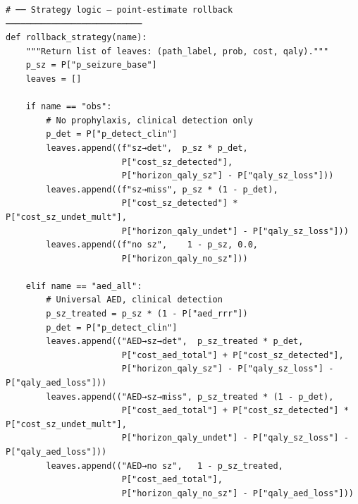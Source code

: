 \documentclass[11pt,a4paper]{article}
\begin{document}
\begin{lstlisting}[style=codeblock]
# ── Strategy logic — point-estimate rollback ───────────────────────────
def rollback_strategy(name):
    """Return list of leaves: (path_label, prob, cost, qaly)."""
    p_sz = P["p_seizure_base"]
    leaves = []

    if name == "obs":
        # No prophylaxis, clinical detection only
        p_det = P["p_detect_clin"]
        leaves.append((f"sz→det",  p_sz * p_det,
                       P["cost_sz_detected"],
                       P["horizon_qaly_sz"] - P["qaly_sz_loss"]))
        leaves.append((f"sz→miss", p_sz * (1 - p_det),
                       P["cost_sz_detected"] * P["cost_sz_undet_mult"],
                       P["horizon_qaly_undet"] - P["qaly_sz_loss"]))
        leaves.append((f"no sz",    1 - p_sz, 0.0,
                       P["horizon_qaly_no_sz"]))

    elif name == "aed_all":
        # Universal AED, clinical detection
        p_sz_treated = p_sz * (1 - P["aed_rrr"])
        p_det = P["p_detect_clin"]
        leaves.append(("AED→sz→det",  p_sz_treated * p_det,
                       P["cost_aed_total"] + P["cost_sz_detected"],
                       P["horizon_qaly_sz"] - P["qaly_sz_loss"] - P["qaly_aed_loss"]))
        leaves.append(("AED→sz→miss", p_sz_treated * (1 - p_det),
                       P["cost_aed_total"] + P["cost_sz_detected"] * P["cost_sz_undet_mult"],
                       P["horizon_qaly_undet"] - P["qaly_sz_loss"] - P["qaly_aed_loss"]))
        leaves.append(("AED→no sz",   1 - p_sz_treated,
                       P["cost_aed_total"],
                       P["horizon_qaly_no_sz"] - P["qaly_aed_loss"]))


\end{lstlisting}
\end{document}
